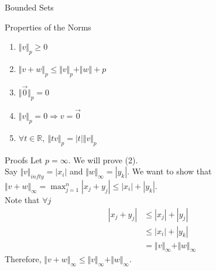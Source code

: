\documentclass[10pt]{extarticle}
\newcommand{\R}{\mathbb{R}}
\begin{document}
\begin{problem}{Bounded Sets}
\begin{problem}{Properties of the Norms}
\begin{description}
          \begin{enumerate}[(1)]
            \item $\Vert v\Vert_p \geq 0$
            \item $\Vert v+w \Vert_p \leq \Vert v\Vert_p + \Vert w \Vert+p$
            \item $\Vert \vec{0}\Vert_p = 0$
            \item $\Vert v\Vert_p = 0 \Rightarrow v = \vec{0}$
            \item $\forall t\in \R,~\Vert tv \Vert_{p} = |t| \Vert v \Vert_p$ 
          \end{enumerate}
      \end{description}
      \begin{problem}{Proofs}
        Let $p = \infty$. We will prove (2).\\

        Say $\Vert v \Vert_{infty} = |x_i|$ and $\Vert w \Vert_{\infty} = |y_k|$. We want to show that $\Vert v + w \Vert_{\infty} = \max_{j=1}^{n}|x_j + y_j| \leq |x_i| + |y_k|$.\\

        Note that $\forall j$
        \begin{align*}
          |x_j + y_j| &\leq |x_j| + |y_j| \tag*{Triangle Inequality}\\
                      &\leq |x_i| + |y_k| \\
                      &= \Vert v \Vert_{\infty} + \Vert w \Vert_{\infty}
        \end{align*}
        Therefore, $\Vert v + w \Vert_{\infty} \leq \Vert v \Vert_{\infty} + \Vert w \Vert_{\infty}$.
      \end{problem}
    \end{problem}
  \end{problem}
\end{document}
